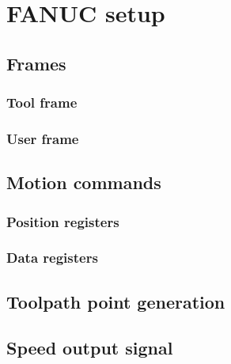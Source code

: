 \section{FANUC setup}

\subsection{Frames}
    \subsubsection{Tool frame}
    \subsubsection{User frame}
\subsection{Motion commands}
    \subsubsection{Position registers}
    \subsubsection{Data registers}
\subsection{Toolpath point generation}
\subsection{Speed output signal}
